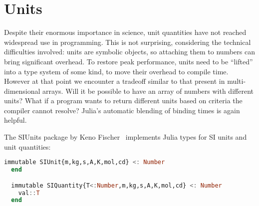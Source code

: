 \iffalse
QR factorization: want to support it on all input types, but many
types (integer, rational) are not closed under the needed operations.
compare to eigen: in C++, if you want a qrfact of an integer matrix,
you might get a compile time error, or it might work but all the values
will be truncated when stored. this is a big generic programming
challenge. you can't expect types to have a ``type to use for QR fact''
trait.

qrfact computes the type of the result needed:

\begin{singlespace}
\begin{lstlisting}[language=julia]
function qrfact{T}(A::StridedMatrix{T}; pivot=false)
    S = typeof(one(T)/norm(one(T)))
    if S != T
        qrfact!(convert(AbstractMatrix{S},A), pivot=pivot)
    else
        qrfact!(copy(A),pivot=pivot))
    end
end
\end{lstlisting}
\end{singlespace}

This code is not statically typeable, and yet with specialization a
compiler could in fact determine the type of each call site.
It just happens to be convenient to specify this behavior with a
branch.
\fi

\section{Units}

Despite their enormous importance in science, unit quantities have
not reached widespread use in programming.
This is not surprising, considering the technical difficulties involved:
units are symbolic objects, so attaching them to numbers can bring
significant overhead.
To restore peak performance, units need to be ``lifted'' into a type
system of some kind, to move their overhead to compile time.
However at that point we encounter a tradeoff similar to that present
in multi-dimensional arrays.
Will it be possible to have an array of numbers with different units?
What if a program wants to return different units based on criteria
the compiler cannot resolve?
Julia's automatic blending of binding times is again helpful.

The SIUnits package by Keno Fischer~\cite{Fischer:2014si} implements
Julia types for SI units and unit quantities:

\begin{singlespace}
\begin{lstlisting}[language=julia]
  immutable SIUnit{m,kg,s,A,K,mol,cd} <: Number
  end

  immutable SIQuantity{T<:Number,m,kg,s,A,K,mol,cd} <: Number
    val::T
  end
\end{lstlisting}
\end{singlespace}

